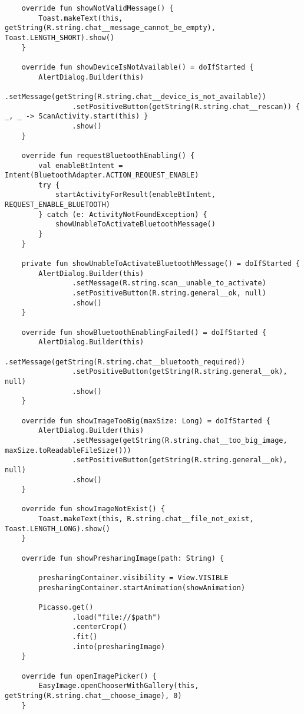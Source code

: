 \begin{lstlisting}
    override fun showNotValidMessage() {
        Toast.makeText(this, getString(R.string.chat__message_cannot_be_empty), Toast.LENGTH_SHORT).show()
    }

    override fun showDeviceIsNotAvailable() = doIfStarted {
        AlertDialog.Builder(this)
                .setMessage(getString(R.string.chat__device_is_not_available))
                .setPositiveButton(getString(R.string.chat__rescan)) { _, _ -> ScanActivity.start(this) }
                .show()
    }

    override fun requestBluetoothEnabling() {
        val enableBtIntent = Intent(BluetoothAdapter.ACTION_REQUEST_ENABLE)
        try {
            startActivityForResult(enableBtIntent, REQUEST_ENABLE_BLUETOOTH)
        } catch (e: ActivityNotFoundException) {
            showUnableToActivateBluetoothMessage()
        }
    }

    private fun showUnableToActivateBluetoothMessage() = doIfStarted {
        AlertDialog.Builder(this)
                .setMessage(R.string.scan__unable_to_activate)
                .setPositiveButton(R.string.general__ok, null)
                .show()
    }

    override fun showBluetoothEnablingFailed() = doIfStarted {
        AlertDialog.Builder(this)
                .setMessage(getString(R.string.chat__bluetooth_required))
                .setPositiveButton(getString(R.string.general__ok), null)
                .show()
    }

    override fun showImageTooBig(maxSize: Long) = doIfStarted {
        AlertDialog.Builder(this)
                .setMessage(getString(R.string.chat__too_big_image, maxSize.toReadableFileSize()))
                .setPositiveButton(getString(R.string.general__ok), null)
                .show()
    }

    override fun showImageNotExist() {
        Toast.makeText(this, R.string.chat__file_not_exist, Toast.LENGTH_LONG).show()
    }

    override fun showPresharingImage(path: String) {

        presharingContainer.visibility = View.VISIBLE
        presharingContainer.startAnimation(showAnimation)

        Picasso.get()
                .load("file://$path")
                .centerCrop()
                .fit()
                .into(presharingImage)
    }

    override fun openImagePicker() {
        EasyImage.openChooserWithGallery(this, getString(R.string.chat__choose_image), 0)
    }


\end{lstlisting}
